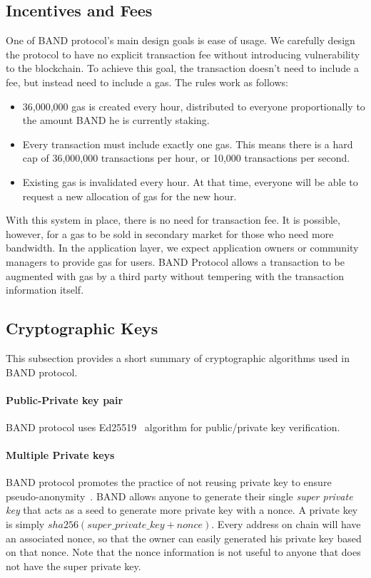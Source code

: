 \documentclass[letterpaper,11pt]{article}
\begin{document}
\subsection{Incentives and Fees} \label{sec:incentives-and-fees}
One of BAND protocol's main design goals is ease of usage. We carefully design the protocol to have no explicit transaction fee without introducing vulnerability to the blockchain. To achieve this goal, the transaction doesn't need to include a fee, but instead need to include a gas. The rules work as follows:

\begin{itemize}
\setlength\itemsep{0em}
\item 36,000,000 gas is created every hour, distributed to everyone proportionally to the amount BAND he is currently staking.
\item Every transaction must include exactly one gas. This means there is a hard cap of 36,000,000 transactions per hour, or 10,000 transactions per second.
\item Existing gas is invalidated every hour. At that time, everyone will be able to request a new allocation of gas for the new hour.
\end{itemize}

With this system in place, there is no need for transaction fee. It is possible, however, for a gas to be sold in secondary market for those who need more bandwidth. In the application layer, we expect application owners or community managers to provide gas for users. BAND Protocol allows a transaction to be augmented with gas by a third party without tempering with the transaction information itself.

\subsection{Cryptographic Keys}
This subsection provides a short summary of cryptographic algorithms used in BAND protocol.

\paragraph{Public-Private key pair} BAND protocol uses Ed25519~\cite{bernstein2012high} algorithm for public/private key verification.

\paragraph{Multiple Private keys} BAND protocol promotes the practice of not reusing private key to ensure pseudo-anonymity~\cite{moser2013anonymity}. BAND allows anyone to generate their single \emph{super private key} that acts as a seed to generate more private key with a nonce. A private key is simply $sha256(super\_private\_key + nonce)$. Every address on chain will have an associated nonce, so that the owner can easily generated his private key based on that nonce. Note that the nonce information is not useful to anyone that does not have the super private key.
\end{document}
